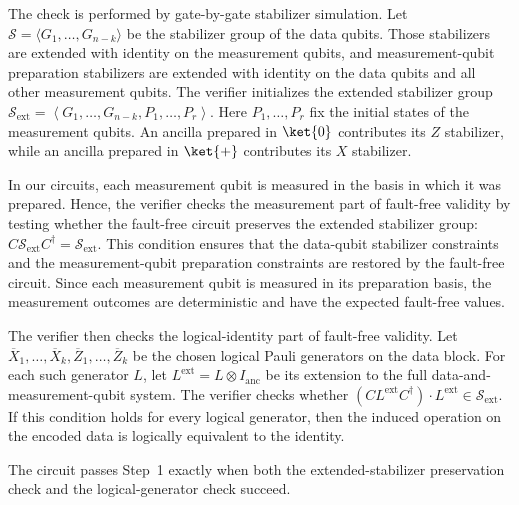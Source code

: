 \documentclass[acmsmall,screen,review,anonymous,nonacm]{acmart}
\begin{document}
The check is performed by gate-by-gate stabilizer simulation. Let $\mathcal{S}=\langle G_1,\ldots,G_{n-k}\rangle$ be the stabilizer group of the data qubits. Those stabilizers are extended with identity on the measurement qubits, and measurement-qubit preparation stabilizers are extended with identity on the data qubits and all other measurement qubits. The verifier initializes the extended stabilizer group $\mathcal{S}_{\mathrm{ext}}=\left\langle G_1,\ldots,G_{n-k}, P_1,\ldots,P_r \right\rangle$. Here $P_1,\ldots,P_r$ fix the initial states of the measurement qubits. An ancilla prepared in $\ket{0}$ contributes its $Z$ stabilizer, while an ancilla prepared in $\ket{+}$ contributes its $X$ stabilizer.

In our circuits, each measurement qubit is measured in the basis in which it was prepared. Hence, the verifier checks the measurement part of fault-free validity by testing whether the fault-free circuit preserves the extended stabilizer group: $C\mathcal{S}_{\mathrm{ext}}C^\dagger=\mathcal{S}_{\mathrm{ext}}$. This condition ensures that the data-qubit stabilizer constraints and the measurement-qubit preparation constraints are restored by the fault-free circuit. Since each measurement qubit is measured in its preparation basis, the measurement outcomes are deterministic and have the expected fault-free values.

The verifier then checks the logical-identity part of fault-free validity. Let $\overline{X}_1,\ldots,\overline{X}_k,\overline{Z}_1,\ldots,\overline{Z}_k$ be the chosen logical Pauli generators on the data block. For each such generator $L$, let $L^{\mathrm{ext}}=L\otimes I_{\mathrm{anc}}$ be its extension to the full data-and-measurement-qubit system. The verifier checks whether $(CL^{\mathrm{ext}}C^\dagger)\cdot L^{\mathrm{ext}}\in\mathcal{S}_{\mathrm{ext}}$. If this condition holds for every logical generator, then the induced operation on the encoded data is logically equivalent to the identity.

The circuit passes Step~1 exactly when both the extended-stabilizer preservation check and the logical-generator check succeed.
\end{document}
